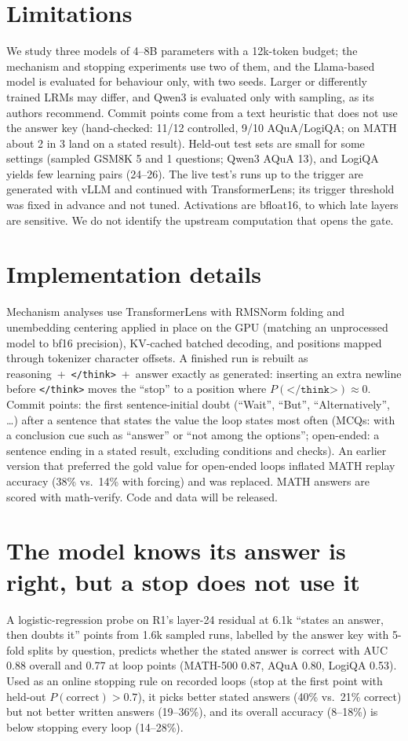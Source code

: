 \documentclass[11pt]{article}
\newcommand{\think}{\texttt{</think>}}
\begin{document}
\section*{Limitations}
We study three models of 4--8B parameters with a 12k-token budget; the mechanism and stopping
experiments use two of them, and the Llama-based model is evaluated for behaviour only, with two seeds.
Larger or differently trained LRMs may differ, and Qwen3 is evaluated only with sampling, as its authors
recommend. Commit points come from a
text heuristic that does not use the answer key (hand-checked: 11/12 controlled, 9/10 AQuA/LogiQA; on
MATH about 2 in 3 land on a stated result). Held-out test sets are small for some settings (sampled GSM8K
5 and 1 questions; Qwen3 AQuA 13), and LogiQA yields few learning pairs (24--26). The live test's runs up
to the trigger are generated with vLLM and continued with TransformerLens; its trigger threshold was fixed
in advance and not tuned. Activations are bfloat16, to which late layers are sensitive. We do not
identify the upstream computation that opens the gate.



\appendix
\section{Implementation details}
\label{app:details}
Mechanism analyses use TransformerLens with RMSNorm folding and unembedding centering applied in place on
the GPU (matching an unprocessed model to bf16 precision), KV-cached batched decoding, and positions mapped
through tokenizer character offsets. A finished run is rebuilt as reasoning~+~\think{}~+~answer exactly as
generated: inserting an extra newline before \think{} moves the ``stop'' to a position where
$P(\think)\approx0$. Commit points: the first sentence-initial doubt (``Wait'', ``But'', ``Alternatively'',
\dots) after a sentence that states the value the loop states most often (MCQs: with a conclusion cue such as
``answer'' or ``not among the options''; open-ended: a sentence ending in a stated result, excluding
conditions and checks). An earlier version that preferred the gold value for open-ended loops inflated MATH
replay accuracy (38\% vs.\ 14\% with forcing) and was replaced. MATH answers are scored with math-verify.
Code and data will be released.

\section{The model knows its answer is right, but a stop does not use it}
\label{app:probe}
A logistic-regression probe on R1's layer-24 residual at 6.1k ``states an answer, then doubts it'' points
from 1.6k sampled runs, labelled by the answer key with 5-fold splits by question, predicts whether the
stated answer is correct with AUC 0.88 overall and 0.77 at loop points (MATH-500 0.87, AQuA 0.80, LogiQA
0.53). Used as an online stopping rule on recorded loops (stop at the first point with held-out
$P(\mathrm{correct})>0.7$), it picks better stated answers (40\% vs.\ 21\% correct) but not better written
answers (19--36\%), and its overall accuracy (8--18\%) is below stopping every loop (14--28\%).
\end{document}
